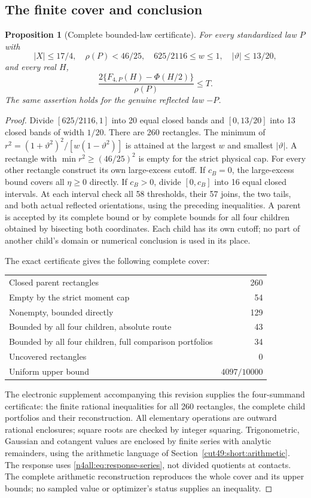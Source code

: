 \documentclass[11pt,a4paper]{article}
\numberwithin{equation}{section}
\newtheorem{proposition}[theorem]{Proposition}
\theoremstyle{definition}
\theoremstyle{remark}
\begin{document}
\subsection{The finite cover and conclusion}
\begin{proposition}[Complete bounded-law certificate]
\label{n4all:prop:certificate}
For every standardized law $P$ with
\[
 |X|\le17/4,\quad \rho(P)<46/25,\quad
 625/2116\le w\le1,\quad |\vartheta|\le13/20,
\]
and every real $H$,
\[
 \frac{2\{F_{4,P}(H)-\Phi(H/2)\}}{\rho(P)}\le T.
\]
The same assertion holds for the genuine reflected law $-P$.
\end{proposition}
\begin{proof}
Divide $[625/2116,1]$ into 20 equal closed bands and $[0,13/20]$
into 13 closed bands of width $1/20$. There are 260 rectangles.
The minimum of
$r^2=(1+\vartheta^2)^2/[w(1-\vartheta^2)]$ is attained at the
largest $w$ and smallest $|\vartheta|$. A rectangle with
$\min r^2\ge(46/25)^2$ is empty for the strict physical cap.
For every other rectangle construct its own large-excess cutoff.
If $c_B=0$, the large-excess bound covers all $\eta\ge0$ directly.
If $c_B>0$, divide $[0,c_B]$ into 16 equal closed intervals. At each interval
check all 58 thresholds, their 57 joins, the two tails, and both
actual reflected orientations, using the preceding inequalities.
A parent is accepted by its complete bound or by complete bounds
for all four children obtained by bisecting both coordinates.
Each child has its own cutoff; no part of another child's domain
or numerical conclusion is used in its place.

The exact certificate gives the following complete cover:
\begin{center}
\begin{tabular}{lr}
\toprule
Closed parent rectangles & 260\\
Empty by the strict moment cap & 54\\
Nonempty, bounded directly & 129\\
Bounded by all four children, absolute route & 43\\
Bounded by all four children, full comparison portfolios & 34\\
Uncovered rectangles & 0\\
Uniform upper bound & $4097/10000$\\
\bottomrule
\end{tabular}
\end{center}
The electronic supplement accompanying this revision supplies the
four-summand certificate: the finite rational inequalities for all
260 rectangles, the complete child portfolios and their reconstruction.
All elementary operations
are outward rational enclosures; square roots are checked by integer
squaring. Trigonometric, Gaussian and cotangent values are enclosed
by finite series with analytic remainders, using the arithmetic
language of Section~\ref{cut49:short:arithmetic}. The response uses
\eqref{n4all:eq:response-series}, not divided quotients at contacts.
The complete arithmetic reconstruction reproduces the whole cover
and its upper bounds; no sampled value or optimizer's status supplies
an inequality.


\end{proof}
\end{document}
